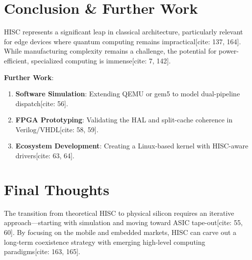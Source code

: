\documentclass[twocolumn, 10pt]{article}
\begin{document}
\section{Conclusion & Further Work}
HISC represents a significant leap in classical architecture, particularly relevant for edge devices where quantum computing remains impractical[cite: 137, 164]. While manufacturing complexity remains a challenge, the potential for power-efficient, specialized computing is immense[cite: 7, 142].

\textbf{Further Work}:
\begin{enumerate}
    \item \textbf{Software Simulation}: Extending QEMU or gem5 to model dual-pipeline dispatch[cite: 56].
    \item \textbf{FPGA Prototyping}: Validating the HAL and split-cache coherence in Verilog/VHDL[cite: 58, 59].
    \item \textbf{Ecosystem Development}: Creating a Linux-based kernel with HISC-aware drivers[cite: 63, 64].
\end{enumerate}

\section*{Final Thoughts}
The transition from theoretical HISC to physical silicon requires an iterative approach—starting with simulation and moving toward ASIC tape-out[cite: 55, 60]. By focusing on the mobile and embedded markets, HISC can carve out a long-term coexistence strategy with emerging high-level computing paradigms[cite: 163, 165].
\end{document}
